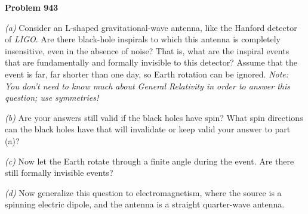 \documentclass[12pt]{article}
\begin{document}
\pagecolor{advancedcolor}\begin{pottproblem}
\textbf{Problem 943}

\textsl{(a)}
Consider an L-shaped gravitational-wave antenna, like the Hanford detector
of \textsl{LIGO}.
Are there black-hole inspirals to which this antenna is completely insensitive,
even in the absence of noise?
That is, what are the inspiral events that are fundamentally and formally invisible to this
detector?
Assume that the event is far, far shorter than one day, so Earth rotation can be ignored.
\emph{Note: You don't need to know much about General Relativity in order to answer this question; use symmetries!}

\textsl{(b)}
Are your answers still valid if the black holes have spin?
What spin directions can the black holes have that will invalidate
or keep valid your answer to part (a)?

\textsl{(c)}
Now let the Earth rotate through a finite angle during the event.
Are there still formally invisible events?

\textsl{(d)}
Now generalize this question to electromagnetism, where the source is a 
spinning electric dipole, and the antenna is a straight quarter-wave antenna.

\end{pottproblem}
\end{document}
